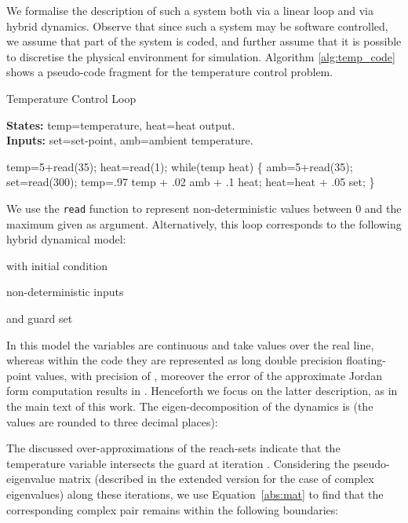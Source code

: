 \documentclass{IEEEtran}
\begin{document}
We formalise the description of such a system both via a linear loop and via hybrid dynamics.  
Observe that since such a system may be software controlled, 
we assume that part of the system is coded, 
and further assume that it is possible to discretise the physical environment for simulation. 
Algorithm \ref{alg:temp_code} shows a pseudo-code fragment for the temperature control problem.
\begin{algorithm}
\caption{Temperature Control Loop}
\textbf{States:} temp=temperature, heat=heat output.\\
\textbf{Inputs:} set=set-point, amb=ambient temperature.
\begin{algorithmic}[1]
\State temp=5+read(35);
\State heat=read(1);
\State while(temp  heat)
\State \{
\State     \hspace{.5cm} amb=5+read(35);
\State     \hspace{.5cm} set=read(300);
\State     \hspace{.5cm} temp=.97 temp + .02 amb + .1 heat;
\State     \hspace{.5cm} heat=heat + .05 set; 
\State \}
\end{algorithmic}
\label{alg:temp_code}
\end{algorithm}
We use the \texttt{read} function to represent non-deterministic values
between 0 and the maximum given as argument.  Alternatively, this loop
corresponds to the following hybrid dynamical model:

with initial condition

non-deterministic inputs

and guard set


In this model the variables are continuous and take values over the real line, 
whereas within the code they are represented as long double precision floating-point values, with precision of , 
moreover the error of the approximate Jordan form computation results in . 
Henceforth we focus on the latter description, as in the main text of this work.
The eigen-decomposition of the dynamics is (the values are rounded to three decimal places):

The discussed over-approximations of the reach-sets indicate that the
temperature variable intersects the guard at iteration . 
Considering the pseudo-eigenvalue matrix (described in the extended version for the case of complex eigenvalues)
along these iterations, we
use Equation~\eqref{abs:mat} to find that the corresponding complex pair
remains within the following boundaries:
 
\end{document}
